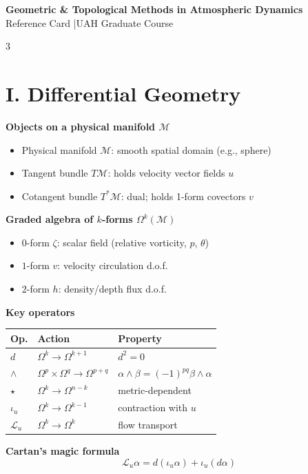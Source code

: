 \documentclass[9pt,letterpaper]{extarticle}
\newcommand{\sect}[1]{\section*{#1}}
\newcommand{\T}[1]{\textbf{#1}}
\begin{document}
\begin{center}
  {\large\bfseries Geometric \& Topological Methods in Atmospheric Dynamics}\\[2pt]
  {\small Reference Card \quad|\quad UAH Graduate Course}
\end{center}
\vspace{2pt}
\begin{multicols}{3}

\sect{I. Differential Geometry}

\T{Objects on a physical manifold $\mathcal{M}$}
\begin{itemize}
  \item Physical manifold $\mathcal{M}$: smooth spatial domain (e.g., sphere)
  \item Tangent bundle $T\mathcal{M}$: holds velocity vector fields $u$
  \item Cotangent bundle $T^*\mathcal{M}$: dual; holds 1-form covectors $v$
\end{itemize}

\T{Graded algebra of $k$-forms $\Omega^k(\mathcal{M})$}
\begin{itemize}
  \item $0$-form $\zeta$: scalar field (relative vorticity, $p$, $\theta$)
  \item $1$-form $v$: velocity circulation d.o.f.
  \item $2$-form $h$: density/depth flux d.o.f.
\end{itemize}

\T{Key operators}\\[2pt]
\begin{tabular}{@{}l@{\;}l@{\;}p{1.4in}@{}}
\toprule
Op. & Action & Property \\
\midrule
$d$ & $\Omega^k\!\to\!\Omega^{k+1}$ & $d^2{=}0$ \\
$\wedge$ & $\Omega^p\!\times\!\Omega^q\!\to\!\Omega^{p+q}$ & $\alpha\wedge\beta{=}(-1)^{pq}\beta\wedge\alpha$ \\
$\star$ & $\Omega^k\!\to\!\Omega^{n-k}$ & metric-dependent \\
$\iota_u$ & $\Omega^k\!\to\!\Omega^{k-1}$ & contraction with $u$ \\
$\mathcal{L}_u$ & $\Omega^k\!\to\!\Omega^k$ & flow transport \\
\bottomrule
\end{tabular}

\T{Cartan's magic formula}
\[\mathcal{L}_u\alpha = d(\iota_u\alpha) + \iota_u(d\alpha)\]


\end{multicols}
\end{document}
